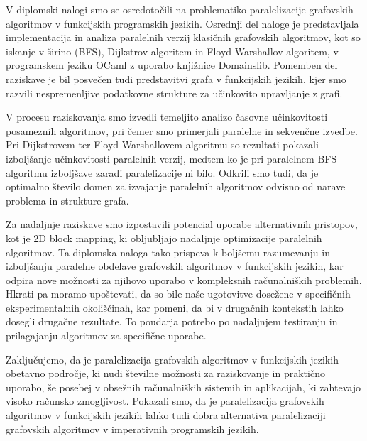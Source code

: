 \documentclass[mat1, tisk]{fmfdelo}
\begin{document}
V diplomski nalogi smo se osredotočili na problematiko paralelizacije grafovskih algoritmov v funkcijskih programskih jezikih.
Osrednji del naloge je predstavljala implementacija in analiza paralelnih verzij klasičnih grafovskih algoritmov, kot so iskanje v širino (BFS),
Dijkstrov algoritem in Floyd-Warshallov algoritem, v programskem jeziku OCaml z uporabo knjižnice Domainslib. Pomemben del raziskave je
bil posvečen tudi predstavitvi grafa v funkcijskih jezikih, kjer smo razvili nespremenljive podatkovne strukture za učinkovito upravljanje z grafi.

V procesu raziskovanja smo izvedli temeljito analizo časovne učinkovitosti posameznih algoritmov, pri čemer smo primerjali paralelne in sekvenčne izvedbe.
Pri Dijkstrovem ter Floyd-Warshallovem algoritmu so rezultati pokazali izboljšanje učinkovitosti paralelnih verzij, medtem ko je pri paralelnem BFS algoritmu
izboljšave zaradi paralelizacije ni bilo. Odkrili smo tudi, da je optimalno število domen za izvajanje paralelnih algoritmov odvisno od narave problema
in strukture grafa.

Za nadaljnje raziskave smo izpostavili potencial uporabe alternativnih pristopov, kot je 2D block mapping, ki obljubljajo nadaljnje
optimizacije paralelnih algoritmov. Ta diplomska naloga tako prispeva k boljšemu razumevanju in izboljšanju paralelne obdelave grafovskih
algoritmov v funkcijskih jezikih, kar odpira nove možnosti za njihovo uporabo v kompleksnih računalniških problemih.
Hkrati pa moramo upoštevati, da so bile naše ugotovitve dosežene v specifičnih eksperimentalnih okoliščinah, kar pomeni, da bi v drugačnih
kontekstih lahko dosegli drugačne rezultate. To poudarja potrebo po nadaljnjem testiranju in prilagajanju algoritmov za specifične uporabe.

Zaključujemo, da je paralelizacija grafovskih algoritmov v funkcijskih jezikih obetavno področje, ki nudi številne možnosti za raziskovanje in
praktično uporabo, še posebej v obsežnih računalniških sistemih in aplikacijah, ki zahtevajo visoko računsko zmogljivost.
Pokazali smo, da je paralelizacija grafovskih algoritmov v funkcijskih jezikih lahko tudi dobra alternativa paralelizaciji grafovskih algoritmov
v imperativnih programskih jezikih.
\end{document}

